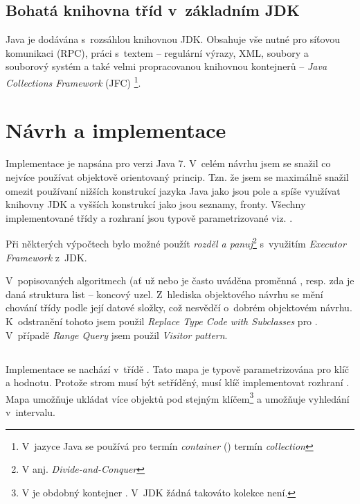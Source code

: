 \subsection{Bohatá knihovna tříd v~základním JDK}

Java je dodávána s~rozsáhlou knihovnou JDK. Obsahuje vše nutné
pro síťovou komunikaci (RPC), práci s~textem -- regulární výrazy,
XML, soubory a souborový
systém a také velmi propracovanou knihovnou kontejnerů -- \emph{Java
Collections Framework }(JFC)
\footnote{V~jazyce Java se používá pro termín \emph{container} (\CC) termín
\emph{collection}}.

\section{Návrh a implementace}
Implementace  je napsána pro verzi Java 7.
V~celém návrhu jsem se snažil co nejvíce používat objektově orientovaný princip.
Tzn. že jsem se maximálně snažil omezit používaní nižších konstrukcí jazyka Java jako jsou pole a spíše využívat knihovny JDK a vyšších konstrukcí jako jsou seznamy, fronty.
Všechny implementované třídy a rozhraní jsou typově parametrizované viz. .

Při některých výpočtech bylo možné použít \emph{rozděl a panuj}\cite{Cormen:2001:IA:580470}\footnote{V anj. \emph{Divide-and-Conquer}} s~využitím \emph{Executor Framework} z~JDK.

V~popisovaných algoritmech (ať už \BPTree{} nebo \MIndex{} je často uváděna proměnná , resp. zda je daná struktura list -- koncový uzel.
Z~hlediska objektového návrhu se mění chování třídy podle její datové složky, což nesvědčí o~dobrém objektovém návrhu.
K~odstranění tohoto jsem použil \emph{Replace Type Code with Subclasses}\cite{fowler1999refactoring} pro \BPTree.
V~případě \MIndex{} \emph{Range Query} jsem použil \emph{Visitor pattern}\cite{gamma1995design}.

\subsection{\BPTree}
Implementace \BPTree{} se nachází v~třídě \linebreak {}. Tato mapa je typově parametrizována pro klíč a hodnotu. Protože strom musí být setříděný, musí klíč implementovat rozhraní . Mapa umožňuje ukládat více objektů pod stejným klíčem\footnote{V \CC{} je obdobný kontejner \cite{ISO:2012:CPP}. V~JDK žádná takováto kolekce není.} a umožňuje vyhledání v~intervalu.

